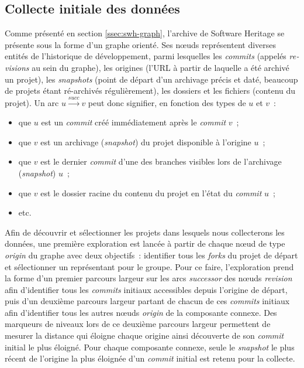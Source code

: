 \documentclass[dvipsnames,runningheads]{llncs}
\newcommand{\en}[1]{\foreignlanguage{english}{\emph{#1}}}
\begin{document}
    \subsection{Collecte initiale des données}

    Comme présenté en section \ref{ssec:swh-graph}, l'archive de Software Heritage se présente sous la forme
    d'un graphe orienté. Ses nœuds représentent diverses entités de l'historique de développement, parmi
    lesquelles les \en{commits} (appelés \en{revisions} au sein du graphe), les origines (l'URL à partir de
    laquelle a été archivé un projet), les \en{snapshots} (point de départ d'un archivage précis et daté,
    beaucoup de projets étant ré-archivés régulièrement), les dossiers et les fichiers (contenu du projet). Un
    arc $u \xrightarrow{succ} v$ peut donc signifier, en fonction des types de $u$ et $v$ : 

    \begin{itemize}
        \item que $u$ est un \en{commit} créé immédiatement après le \en{commit} $v$ ;
        \item que $v$ est un archivage (\en{snapshot}) du projet disponible à l'origine $u$ ;
        \item que $v$ est le dernier \en{commit} d'une des branches visibles lors de l'archivage
            (\en{snapshot}) $u$ ;
        \item que $v$ est le dossier racine du contenu du projet en l'état du \en{commit} $u$ ;
        \item etc.
    \end{itemize}

    Afin de découvrir et sélectionner les projets dans lesquels nous collecterons les données, une première
    exploration est lancée à partir de chaque nœud de type \en{origin} du graphe avec deux objectifs :
    identifier tous les \en{forks} du projet de départ et sélectionner un représentant pour le groupe. Pour ce
    faire, l'exploration prend la forme d'un premier parcours largeur sur les arcs \en{successor} des nœuds
    \en{revision} afin d'identifier tous les \en{commits} initiaux accessibles depuis l'origine de départ, puis
    d'un deuxième parcours largeur partant de chacun de ces \en{commits} initiaux afin d'identifier tous les
    autres nœuds \en{origin} de la composante connexe. Des marqueurs de niveaux lors de ce deuxième parcours
    largeur permettent de mesurer la distance qui éloigne chaque origine ainsi découverte de son \en{commit}
    initial le plus éloigné. Pour chaque composante connexe, seule le \en{snapshot} le plus récent de
    l'origine la plus éloignée d'un \en{commit} initial est retenu pour la collecte.
\end{document}

